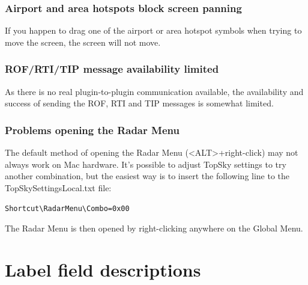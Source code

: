 \documentclass[11pt,a4paper,oldfontcommands]{memoir}
\begin{document}
\subsection*{Airport and area hotspots block screen panning}

If you happen to drag one of the airport or area hotspot symbols when trying to move the screen, the screen will not move.

\subsection*{ROF/RTI/TIP message availability limited}

As there is no real plugin-to-plugin communication available, the availability and success of sending the ROF, RTI and TIP messages is somewhat limited.

\subsection*{Problems opening the Radar Menu}

The default method of opening the Radar Menu (<ALT>+right-click) may not always work on Mac hardware. It’s possible to adjust TopSky settings to try another combination, but the easiest way is to insert the following line to the TopSkySettingsLocal.txt file:

\verb|Shortcut\RadarMenu\Combo=0x00|

The Radar Menu is then opened by right-clicking anywhere on the Global Menu.

\appendix
\chapter{Label field descriptions}
\end{document}
